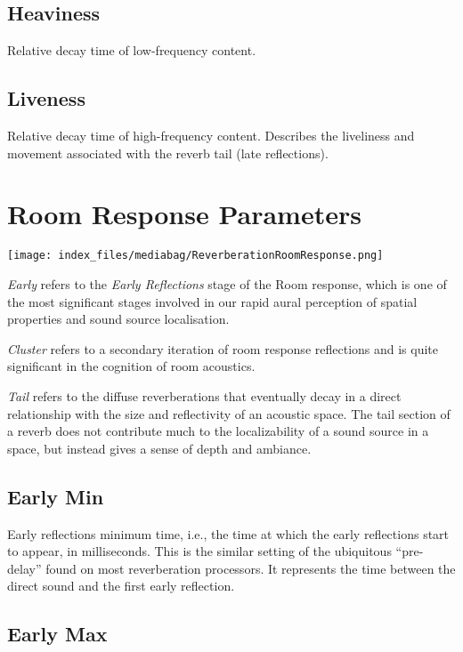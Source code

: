 \documentclass[
  letterpaper,
  DIV=11,
  numbers=noendperiod]{scrreport}
\begin{document}
\hypertarget{heaviness}{%
\subsection{Heaviness}\label{heaviness}}

Relative decay time of low-frequency content.

\hypertarget{liveness}{%
\subsection{Liveness}\label{liveness}}

Relative decay time of high-frequency content. Describes the liveliness
and movement associated with the reverb tail (late reflections).

\hypertarget{room-response-parameters}{%
\section{Room Response Parameters}\label{room-response-parameters}}

\texttt{[image: index\_files/mediabag/ReverberationRoomResponse.png]}

\emph{Early} refers to the \emph{Early Reflections} stage of the Room
response, which is one of the most significant stages involved in our
rapid aural perception of spatial properties and sound source
localisation.

\emph{Cluster} refers to a secondary iteration of room response
reflections and is quite significant in the cognition of room acoustics.

\emph{Tail} refers to the diffuse reverberations that eventually decay
in a direct relationship with the size and reflectivity of an acoustic
space. The tail section of a reverb does not contribute much to the
localizability of a sound source in a space, but instead gives a sense
of depth and ambiance.

\hypertarget{early-min}{%
\subsection{Early Min}\label{early-min}}

Early reflections minimum time, i.e., the time at which the early
reflections start to appear, in milliseconds. This is the similar
setting of the ubiquitous ``pre-delay'' found on most reverberation
processors. It represents the time between the direct sound and the
first early reflection.

\hypertarget{early-max}{%
\subsection{Early Max}\label{early-max}}
\end{document}
